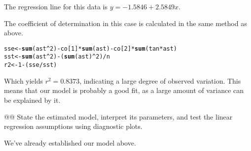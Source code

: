 \documentclass[10pt]{article}\usepackage[]{graphicx}\usepackage[]{xcolor}
\makeatletter
\newcommand{\hlnum}[1]{\textcolor[rgb]{0.686,0.059,0.569}{#1} }%
\newcommand{\hlopt}[1]{\textcolor[rgb]{0,0,0}{#1} }%
\newcommand{\hlstd}[1]{\textcolor[rgb]{0.345,0.345,0.345}{#1} }%
\newcommand{\hlkwb}[1]{\textcolor[rgb]{0.69,0.353,0.396}{#1} }%
\newcommand{\hlkwd}[1]{\textcolor[rgb]{0.737,0.353,0.396}{\textbf{#1} } }%
\newenvironment{kframe}{%
 \def\at@end@of@kframe{}%
 \ifinner\ifhmode%
  \def\at@end@of@kframe{\end{minipage} }%
  \begin{minipage}{\columnwidth}%
 \fi\fi%
 \def\FrameCommand##1{\hskip\@totalleftmargin \hskip-\fboxsep
 \colorbox{shadecolor}{##1}\hskip-\fboxsep
     \hskip-\linewidth \hskip-\@totalleftmargin \hskip\columnwidth}%
 \MakeFramed {\advance\hsize-\width
   \@totalleftmargin\z@ \linewidth\hsize
   \@setminipage} }%
 {\par\unskip\endMakeFramed%
 \at@end@of@kframe}
\newenvironment{knitrout}{}{} %
\makeatother
\begin{document}
\begin{easylist}[enumerate]
    The regression line for this data is $y = -1.5846 + 2.5849x$.\newline

    The coefficient of determination in this case is calculated in the same method as above.

\begin{knitrout}
\color{fgcolor}\begin{kframe}
\begin{alltt}
         \hlstd{sse} \hlkwb{<-} \hlkwd{sum}\hlstd{(ast}\hlopt{^}\hlnum{2}\hlstd{)} \hlopt{-} \hlstd{co[}\hlnum{1}\hlstd{]} \hlopt{*} \hlkwd{sum}\hlstd{(ast)} \hlopt{-} \hlstd{co[}\hlnum{2}\hlstd{]} \hlopt{*} \hlkwd{sum}\hlstd{(tan} \hlopt{*} \hlstd{ast)}
         \hlstd{sst} \hlkwb{<-} \hlkwd{sum}\hlstd{(ast}\hlopt{^}\hlnum{2}\hlstd{)} \hlopt{-} \hlstd{(}\hlkwd{sum}\hlstd{(ast)}\hlopt{^}\hlnum{2}\hlstd{)}\hlopt{/}\hlstd{n}
         \hlstd{r2} \hlkwb{<-} \hlnum{1} \hlopt{-} \hlstd{(sse} \hlopt{/} \hlstd{sst)}
\end{alltt}
\end{kframe}
\end{knitrout}


    Which yields $r^2 = 0.8373$, indicating a large degree of observed variation. This means that our model is
    probably a good fit, as a large amount of variance can be explained by it.

    @@ State the estimated model, interpret its parameters, and test the linear regression assumptions using diagnostic
    plots.\newline

    We've already established our model above.


\end{easylist}
\end{document}
